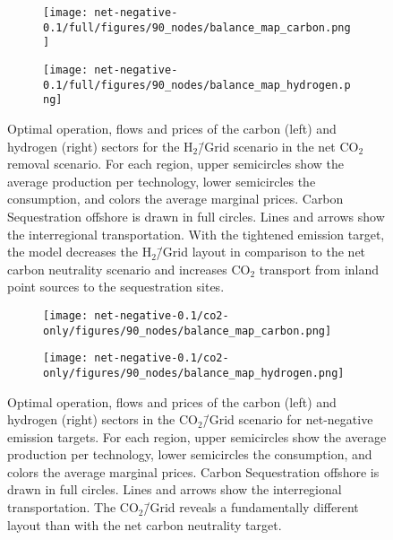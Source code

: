 \documentclass[twocolumn]{article}
\newcommand{\carbon}{CO$_2$}
\newcommand{\carbongrid}{CO$_2$\=/Grid}
\newcommand{\hydrogengrid}{H$_2$\=/Grid}
\newcommand{\carbonscenario}{CO$_2$\=/Grid scenario}
\newcommand{\hydrogenscenario}{H$_2$\=/Grid scenario}
\begin{document}
\begin{figure}[ht!]
    \centering
    \begin{subfigure}{.5\textwidth}
        \centering
        \texttt{[image: net-negative-0.1/full/figures/90\_nodes/balance\_map\_carbon.png]}
        \label{fig:balance_map_carbon_full_nn}
    \end{subfigure}%
    \begin{subfigure}{.5\textwidth}
        \centering
        \texttt{[image: net-negative-0.1/full/figures/90\_nodes/balance\_map\_hydrogen.png]}
        \label{fig:balance_map_hydrogen_full_nn}
    \end{subfigure}
    \caption{Optimal operation, flows and prices of the carbon (left) and hydrogen (right) sectors for the \hydrogenscenario{} in the net \carbon{} removal scenario. For each region, upper semicircles show the average production per technology, lower semicircles the consumption, and colors the average marginal prices. Carbon Sequestration offshore is drawn in full circles. Lines and arrows show the interregional transportation. With the tightened emission target, the model decreases the \hydrogengrid{} layout in comparison to the net carbon neutrality scenario and increases \carbon{} transport from inland point sources to the sequestration sites.
    }
    \label{fig:balance_maps_full_nn}
\end{figure}

\begin{figure}[ht!]
    \centering
    \begin{subfigure}{.5\textwidth}
        \centering
        \texttt{[image: net-negative-0.1/co2-only/figures/90\_nodes/balance\_map\_carbon.png]}
        \label{fig:balance_map_carbon_co2_nn}
    \end{subfigure}%
    \begin{subfigure}{.5\textwidth}
        \centering
        \texttt{[image: net-negative-0.1/co2-only/figures/90\_nodes/balance\_map\_hydrogen.png]}
        \label{fig:balance_map_hydrogen_co2_nn}
    \end{subfigure}
    \caption{Optimal operation, flows and prices of the carbon (left) and hydrogen (right) sectors in the \carbonscenario{} for net-negative emission targets. For each region, upper semicircles show the average production per technology, lower semicircles the consumption, and colors the average marginal prices. Carbon Sequestration offshore is drawn in full circles. Lines and arrows show the interregional transportation. The \carbongrid{} reveals a fundamentally different layout than with the net carbon neutrality target.
    }
    \label{fig:balance_maps_co2_nn}
\end{figure}
\end{document}
